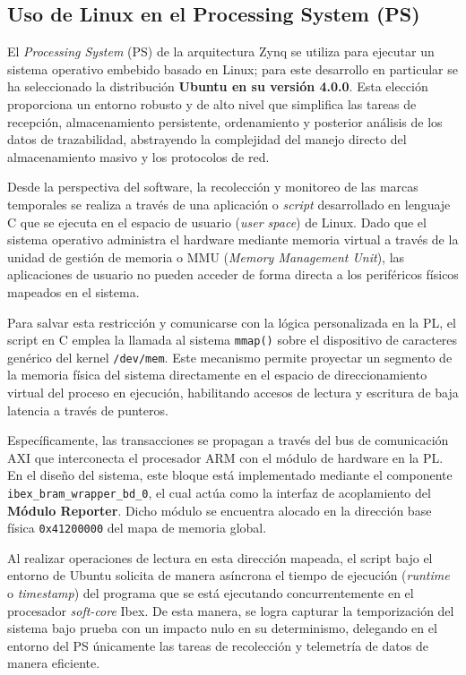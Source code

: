 \subsection{Uso de Linux en el Processing System (PS)}
\label{ssec:linux_ps}

El \textit{Processing System} (PS) de la arquitectura Zynq se utiliza para ejecutar un sistema operativo embebido basado en Linux; para este desarrollo en particular se ha seleccionado la distribución \textbf{Ubuntu en su versión 4.0.0}. Esta elección proporciona un entorno robusto y de alto nivel que simplifica las tareas de recepción, almacenamiento persistente, ordenamiento y posterior análisis de los datos de trazabilidad, abstrayendo la complejidad del manejo directo del almacenamiento masivo y los protocolos de red.

Desde la perspectiva del software, la recolección y monitoreo de las marcas temporales se realiza a través de una aplicación o \textit{script} desarrollado en lenguaje C que se ejecuta en el espacio de usuario (\textit{user space}) de Linux. Dado que el sistema operativo administra el hardware mediante memoria virtual a través de la unidad de gestión de memoria o MMU (\textit{Memory Management Unit}), las aplicaciones de usuario no pueden acceder de forma directa a los periféricos físicos mapeados en el sistema. 

Para salvar esta restricción y comunicarse con la lógica personalizada en la PL, el script en C emplea la llamada al sistema \texttt{mmap()} sobre el dispositivo de caracteres genérico del kernel \texttt{/dev/mem}. Este mecanismo permite proyectar un segmento de la memoria física del sistema directamente en el espacio de direccionamiento virtual del proceso en ejecución, habilitando accesos de lectura y escritura de baja latencia a través de punteros.

Específicamente, las transacciones se propagan a través del bus de comunicación AXI que interconecta el procesador ARM con el módulo de hardware en la PL. En el diseño del sistema, este bloque está implementado mediante el componente \texttt{ibex\_bram\_wrapper\_bd\_0}, el cual actúa como la interfaz de acoplamiento del \textbf{Módulo Reporter}. Dicho módulo se encuentra alocado en la dirección base física \texttt{0x41200000} del mapa de memoria global. 

Al realizar operaciones de lectura en esta dirección mapeada, el script bajo el entorno de Ubuntu solicita de manera asíncrona el tiempo de ejecución (\textit{runtime} o \textit{timestamp}) del programa que se está ejecutando concurrentemente en el procesador \textit{soft-core} Ibex. De esta manera, se logra capturar la temporización del sistema bajo prueba con un impacto nulo en su determinismo, delegando en el entorno del PS únicamente las tareas de recolección y telemetría de datos de manera eficiente.
